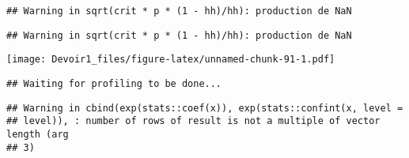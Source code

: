 \documentclass[]{article}
\newenvironment{Shaded}{\begin{snugshade}}{\end{snugshade}}
\newcommand{\KeywordTok}[1]{\textcolor[rgb]{0.13,0.29,0.53}{\textbf{#1}}}
\newcommand{\DataTypeTok}[1]{\textcolor[rgb]{0.13,0.29,0.53}{#1}}
\newcommand{\DecValTok}[1]{\textcolor[rgb]{0.00,0.00,0.81}{#1}}
\newcommand{\StringTok}[1]{\textcolor[rgb]{0.31,0.60,0.02}{#1}}
\newcommand{\OperatorTok}[1]{\textcolor[rgb]{0.81,0.36,0.00}{\textbf{#1}}}
\newcommand{\NormalTok}[1]{#1}
\begin{document}
\begin{verbatim}
## Warning in sqrt(crit * p * (1 - hh)/hh): production de NaN
\end{verbatim}

\begin{verbatim}
## Warning in sqrt(crit * p * (1 - hh)/hh): production de NaN
\end{verbatim}

\texttt{[image: Devoir1\_files/figure-latex/unnamed-chunk-91-1.pdf]}

\begin{Shaded}
\end{Shaded}

\begin{verbatim}
## Waiting for profiling to be done...
\end{verbatim}

\begin{verbatim}
## Warning in cbind(exp(stats::coef(x)), exp(stats::confint(x, level =
## level)), : number of rows of result is not a multiple of vector length (arg
## 3)
\end{verbatim}
\end{document}
